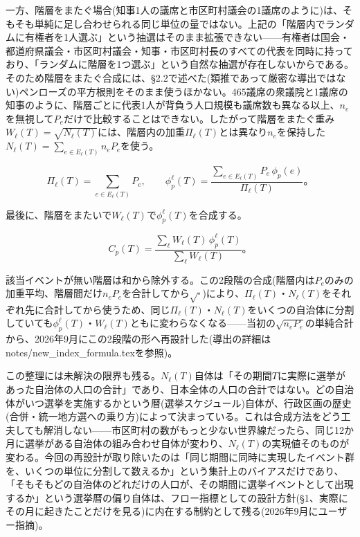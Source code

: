\documentclass[a4paper,11pt]{ltjsarticle}
\begin{document}
一方、階層をまたぐ場合(知事1人の議席と市区町村議会の1議席のように)は、そもそも単純に足し合わせられる同じ単位の量ではない。上記の「階層内でランダムに有権者を1人選ぶ」という抽選はそのまま拡張できない——有権者は国会・都道府県議会・市区町村議会・知事・市区町村長のすべての代表を同時に持っており、「ランダムに階層を1つ選ぶ」という自然な抽選が存在しないからである。そのため階層をまたぐ合成には、\S2.2で述べた(類推であって厳密な導出ではない)ペンローズの平方根則をそのまま使うほかない。465議席の衆議院と1議席の知事のように、階層ごとに代表1人が背負う人口規模も議席数も異なる以上、$n_e$を無視して$P_e$だけで比較することはできない。したがって階層をまたぐ重み$W_\ell(T)=\sqrt{N_\ell(T)}$には、階層内の加重$\Pi_\ell(T)$とは異なり$n_e$を保持した$N_\ell(T)=\sum_{e\in E_\ell(T)} n_eP_e$を使う。

\[
\Pi_\ell(T) = \sum_{e\in E_\ell(T)} P_e, \qquad
\phi_p^\ell(T) = \frac{\displaystyle\sum_{e\in E_\ell(T)} P_e\,\phi_p(e)}{\Pi_\ell(T)}。
\]

最後に、階層をまたいで$W_\ell(T)$で$\phi_p^\ell(T)$を合成する。

\[
C_p(T) = \frac{\displaystyle\sum_{\ell} W_\ell(T)\,\phi_p^\ell(T)}
               {\displaystyle\sum_{\ell} W_\ell(T)}。
\]

該当イベントが無い階層は和から除外する。この2段階の合成(階層内は$P_e$のみの加重平均、階層間だけ$n_eP_e$を合計してから$\sqrt{\cdot}$)により、$\Pi_\ell(T)$・$N_\ell(T)$をそれぞれ先に合計してから使うため、同じ$\Pi_\ell(T)$・$N_\ell(T)$をいくつの自治体に分割していても$\phi_p^\ell(T)$・$W_\ell(T)$ともに変わらなくなる——当初の$\sqrt{n_eP_e}$の単純合計から、2026年9月にこの2段階の形へ再設計した(導出の詳細はnotes/new\_index\_formula.texを参照)。

この整理には未解決の限界も残る。$N_\ell(T)$自体は「その期間$T$に実際に選挙があった自治体の人口の合計」であり、日本全体の人口の合計ではない。どの自治体がいつ選挙を実施するかという暦(選挙スケジュール)自体が、行政区画の歴史(合併・統一地方選への乗り方)によって決まっている。これは合成方法をどう工夫しても解消しない——市区町村の数がもっと少ない世界線だったら、同じ12か月に選挙がある自治体の組み合わせ自体が変わり、$N_\ell(T)$の実現値そのものが変わる。今回の再設計が取り除いたのは「同じ期間に同時に実現したイベント群を、いくつの単位に分割して数えるか」という集計上のバイアスだけであり、「そもそもどの自治体のどれだけの人口が、その期間に選挙イベントとして出現するか」という選挙暦の偏り自体は、フロー指標としての設計方針(\S1、実際にその月に起きたことだけを見る)に内在する制約として残る(2026年9月にユーザー指摘)。
\end{document}
